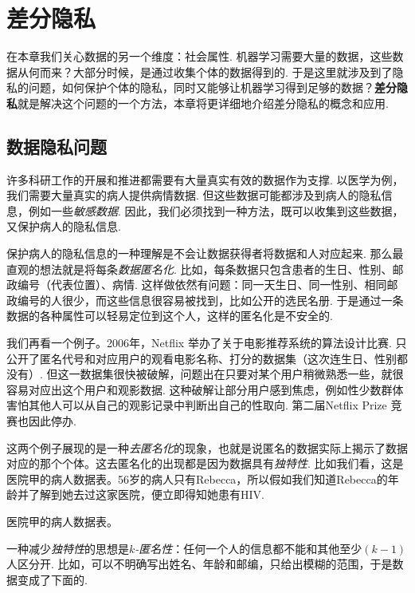 \chapter{差分隐私}\label{chap:differential-privacy}

在本章我们关心数据的另一个维度：社会属性. 机器学习需要大量的数据，这些数据从何而来？大部分时候，是通过收集个体的数据得到的. 于是这里就涉及到了隐私的问题，如何保护个体的隐私，同时又能够让机器学习得到足够的数据？\textbf{差分隐私}就是解决这个问题的一个方法，本章将更详细地介绍差分隐私的概念和应用. 

\section{数据隐私问题}

许多科研工作的开展和推进都需要有大量真实有效的数据作为支撑. 以医学为例，我们需要大量真实的病人提供病情数据. 但这些数据可能都涉及到病人的隐私信息，例如一些\emph{敏感数据}. 因此，我们必须找到一种方法，既可以收集到这些数据，又保护病人的隐私信息.

保护病人的隐私信息的一种理解是不会让数据获得者将数据和人对应起来. 那么最直观的想法就是将每条\emph{数据匿名化}. 比如，每条数据只包含患者的生日、性别、邮政编号（代表位置）、病情. 这样做依然有问题：同一天生日、同一性别、相同邮政编号的人很少，而这些信息很容易被找到，比如公开的选民名册. 于是通过一条数据的各种属性可以轻易定位到这个人，这样的匿名化是不安全的.

我们再看一个例子。2006年，Netflix 举办了关于电影推荐系统的算法设计比赛.
只公开了匿名代号和对应用户的观看电影名称、打分的数据集（这次连生日、性别都没有）. 但这一数据集很快被破解，问题出在只要对某个用户稍微熟悉一些，就很容易对应出这个用户和观影数据. 这种破解让部分用户感到焦虑，例如性少数群体害怕其他人可以从自己的观影记录中判断出自己的性取向. 第二届Netflix Prize 竞赛也因此停办.

这两个例子展现的是一种\emph{去匿名化}的现象，也就是说匿名的数据实际上揭示了数据对应的那个个体。这去匿名化的出现都是因为数据具有\emph{独特性}. 比如我们看，这是医院甲的病人数据表。56岁的病人只有Rebecca，所以假如我们知道Rebecca的年龄并了解到她去过这家医院，便立即得知她患有HIV.

\begin{table}[!ht]
\centering

\caption{医院甲的病人数据表。}
\label{tab:tab01}
\end{table}

一种减少\emph{独特性}的思想是\emph{$k$-匿名性}：任何一个人的信息都不能和其他至少$(k-1)$人区分开. 比如，可以不明确写出姓名、年龄和邮编，只给出模糊的范围，于是数据变成了下面的.

